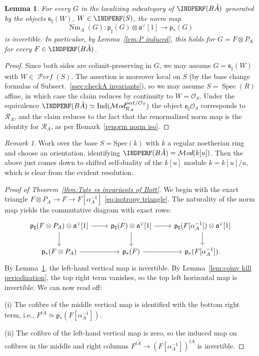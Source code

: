 \documentclass[12pt, oneside]{amsart}
\numberwithin{equation}{section}
\newtheorem{lemma}[subsubsection]{Lemma}
\theoremstyle{remark}
\newtheorem{remark}[subsubsection]{Remark}
\theoremstyle{plain}
\newcommand{\MOD}{\mathcal{M}\textit{od}}
\DeclareMathOperator{\PERF}{\mathcal{P}\textit{erf}}
\newcommand{\R}{\mathcal{R}}
\newcommand{\RA}{\R_A}
\newcommand{\frav}{\mathfrak{a}^\vee}
\newcommand{\OO}{\mathcal{O}}
\DeclareMathOperator{\spc}{Spec}
\newcommand{\Ind}{\operatorname{Ind}}
\newcommand{\Nm}{\operatorname{Nm}}
\newcommand{\sfp}{\mathsf{p}}
\newcommand{\sfe}{\mathsf{e}}
\begin{document}
\begin{lemma}\label{lem:norm invertible induced}
For every $G$ in the localizing subcategory of $\INDPERF(B\check{A})$ generated by the objects $\sfe_\sharp(W)$, $W \in \INDPERF(S)$, the norm map
\[
  \Nm_A(G) : \sfp_\sharp(G) \otimes \frav[1] \longrightarrow \sfp_*(G)
\]
is invertible.
In particular, by Lemma~\ref{lem:P induced}, this holds for $G = F \otimes P_A$ for every $F \in \INDPERF(B\check{A})$.
\end{lemma}
\begin{proof}
Since both sides are colimit-preserving in $G$, we may assume $G = \sfe_\sharp(W)$ with $W \in \PERF(S)$.
The assertion is moreover local on $S$ (by the base change formulas of Subsect.~\ref{ssec:checkA invariants}), so we may assume $S = \spc(R)$ affine, in which case the claim reduces by continuity to $W=\OO_S.$
Under the equivalence $\INDPERF(B\check{A})\simeq\Ind(\MOD_{\RA}^{\mathrm{perf}/\OO_S})$ the object $\sfe_\sharp\OO_S$ corresponds to $\RA$, and the claim reduces to the fact that the renormalized norm map is the identity for $\RA$, as per Remark~\ref{renorm norm iso}.
\end{proof}

\begin{remark} Work over the base $S=\text{Spec}(k)$ with $k$ a regular noetherian ring and choose an orientation, identifying $\INDPERF(B\check{A})=\MOD(k[u])$. Then the above just comes down to shifted self-duality of the $k[u]$ module $k=k[u]/u$, which is clear from the evident resolution. \end{remark}

\begin{proof}[Proof of Theorem~\ref{thm:Tate vs invariants of Bott}]
  We begin with the exact triangle $F \otimes P_A \to F \to F[\alpha_A^{-1}]$ \eqref{eq:isotropy triangle}.
  The naturality of the norm map yields the commutative diagram with exact rows:
  \[\begin{tikzcd}
    \sfp_\sharp(F \otimes P_A) \otimes \frav[1] \ar{r}\ar{d}
    & \sfp_\sharp(F) \otimes \frav[1] \ar{r}\ar{d}
    & \sfp_\sharp(F[\alpha_A^{-1}]) \otimes \frav[1] \ar{d}
    \\
    \sfp_*(F \otimes P_A) \ar{r}
    & \sfp_*(F) \ar{r}
    & \sfp_*(F[\alpha_A^{-1}]).
  \end{tikzcd}\]
  By Lemma~\ref{lem:norm invertible induced}, the left-hand vertical map is invertible.
  By Lemma~\ref{lem:coinv kill periodization}, the top right term vanishes, so the top left horizontal map is invertible.
  We can now read off:

  {\rm(i)}
  The cofibre of the middle vertical map is identified with the bottom right term, i.e., $F^{t\check{A}} \simeq \sfp_*(F[\alpha_A^{-1}])$.

  {\rm(ii)}
  The cofibre of the left-hand vertical map is zero, so the induced map on cofibres in the middle and right columns $F^{t\check{A}} \to (F[\alpha_A^{-1}])^{t\check{A}}$ is invertible.
\end{proof}
\end{document}
